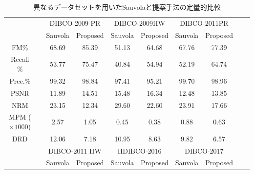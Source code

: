 \documentclass[uplatex, twocolumn,10pt]{jsarticle}
\begin{document}
\begin{table}[tp]
    \centering
    \caption{異なるデータセットを用いたSauvolaと提案手法の定量的比較}
    \label{table3}
    \begin{tabular}{cccccccccc}
        \toprule
                           &  & \multicolumn{2}{c}{DIBCO-2009 PR} & \multicolumn{2}{c}{DIBCO-2009HW} & \multicolumn{2}{c}{DIBCO-2011PR}                                 \\
                           &  & Sauvola                           & Proposed                         & Sauvola                          & Proposed & Sauvola & Proposed \\
        \midrule
        FM\%               &  & 68.69                             & 85.39                            & 51.13                            & 64.68    & 67.76   & 77.39    \\
        Recall \%          &  & 53.77                             & 75.47                            & 40.84                            & 54.94    & 52.19   & 64.74    \\
        Prec.\%            &  & 99.32                             & 98.84                            & 97.41                            & 95.21    & 99.70   & 98.96    \\
        PSNR               &  & 11.89                             & 14.51                            & 15.48                            & 16.34    & 12.48   & 13.85    \\
        NRM                &  & 23.15                             & 12.34                            & 29.60                            & 22.60    & 23.91   & 17.66    \\
        MPM ($\times1000$) &  & 2.57                              & 1.05                             & 0.45                             & 0.38     & 0.88    & 0.63     \\
        DRD                &  & 12.06                             & 7.18                             & 10.95                            & 8.63     & 9.82    & 6.57     \\
        \midrule
                           &  & \multicolumn{2}{c}{DIBCO-2011 HW} & \multicolumn{2}{c}{HDIBCO-2016}  & \multicolumn{2}{c}{DIBCO-2017}                                   \\
                           &  & Sauvola                           & Proposed                         & Sauvola                          & Proposed & Sauvola & Proposed \\

\end{tabular}
\end{table}
\end{document}
